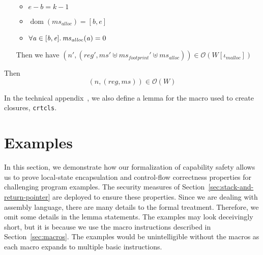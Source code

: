 \documentclass[format=acmsmall, review=true, screen=true]{acmart}
\renewcommand{\sectionname}{Section}
\DeclareMathOperator{\dom}{dom}
\newcommand{\var}[1]{\mathit{#1}}
\newcommand{\hs}{\var{ms}}
\newcommand{\ms}{\hs}
\newcommand{\addr}{\var{a}}
\newcommand{\start}{\var{b}}
\newcommand{\addrend}{\var{e}}
\newcommand{\reg}{\var{reg}}
\newcommand{\codelabel}[1]{\mathit{#1}}
\newcommand{\malloc}{\codelabel{malloc}}
\newcommand{\observations}{\mathcal{O}}
\newcommand{\npair}[2][n]{\left(#1,#2 \right)}
\newenvironment{toplas}{}{}
\newcommand{\itoplassug}[1]{}
\begin{document}
\begin{toplas}
\begin{lemma}
\begin{enumerate}
\begin{itemize}
\begin{equation*}
      \end{equation*}
    \item $\addrend - \start = k - 1$
    \item $\dom(\ms_{\var{alloc}}) = [\start,\addrend]$
    \item $\forall \addr \in [\start,\addrend]\ldotp \ms_{\var{alloc}}(\addr) = 0$
    \end{itemize}
    Then we have $\npair[n']{(\reg',\ms' \uplus \ms_{\var{footprint}}'  \uplus \ms_{\var{alloc}})} \in \observations(W[\iota_\malloc])$
  \end{enumerate}
  Then
  \[
    \npair{(\reg,\ms)} \in \observations(W)
  \]
\end{lemma}
In the technical appendix~\citep{technical_appendix}, we also define a lemma for the macro used to create closures, \texttt{crtcls}.


\end{toplas}

\section{Examples}
\label{sec:examples}
\itoplassug{Suggestion: add a couple of short proof sketches.}
In this section, we demonstrate how our formalization of capability safety allows us to prove local-state encapsulation and control-flow correctness properties for challenging program examples.
The security measures of \sectionname~\ref{sec:stack-and-return-pointer} are deployed to ensure these properties.
Since we are dealing with assembly language, there are many details to the formal treatment. Therefore, we omit some details in the lemma statements.
The examples may look deceivingly short, but it is because we use the macro instructions described in \sectionname~\ref{sec:macros}.
The examples would be unintelligible without the macros as each macro expands to multiple basic instructions.
\end{document}
